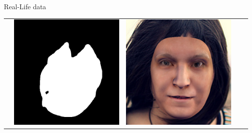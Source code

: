 \documentclass{beamer}
\begin{document}
\begin{frame}[c]{Real-Life data}
\begin{table}[h!]
\begin{tabular}{ | m{1.8cm} | m{1.8cm} | m{1.8cm}| m{1.8cm} | m{1.8cm} |}
\begin{minipage}{1.8cm}
				\vspace{1pt}
			\end{minipage}
			& 
			\begin{minipage}{1.8cm}
				\centering
				\vspace{1pt}
				\includegraphics[width=\linewidth]{realLife/test8_mask_FCN_.png}
				\vspace{1pt}
			\end{minipage}
			& 
			\begin{minipage}{1.8cm}
				\centering
				\vspace{1pt}
				\includegraphics[width=\linewidth]{realLife/test8_overlay_EGGER.png}

\end{minipage}
\end{tabular}
\end{table}
\end{frame}
\end{document}
